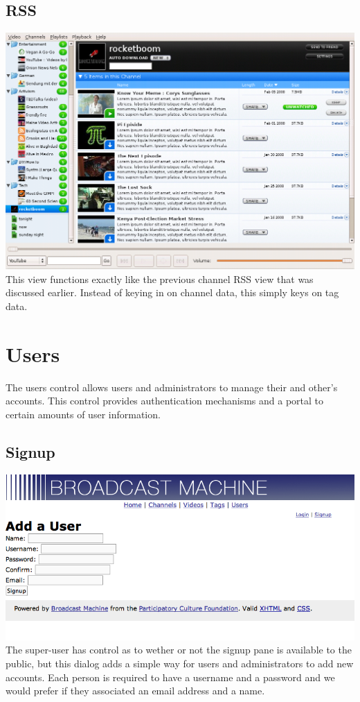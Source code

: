 \documentclass[a4paper,12pt]{report}
\begin{document}
\subsection{RSS}
\includegraphics{images/channelrss.png}
This view functions exactly like the previous channel RSS view that was discussed earlier.
Instead of keying in on channel data, this simply keys on tag data.

\section{Users}
The users control allows users and administrators to manage their and other's accounts.
This control provides authentication mechanisms and a portal to certain amounts of user information.

\subsection{Signup}
\includegraphics{images/usersignup.png}
The super-user has control as to wether or not the signup pane is available to the public, but this dialog adds a simple way for users and administrators to add new accounts.
Each person is required to have a username and a password and we would prefer if they associated an email address and a name.
\end{document}
